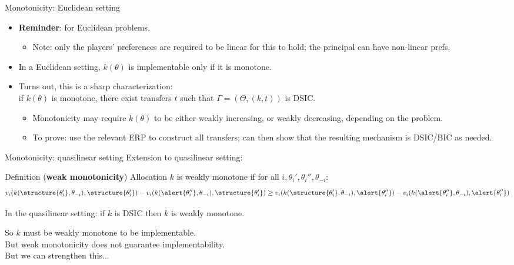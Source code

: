 \documentclass[english,10pt
,aspectratio=169
]{beamer}
\begin{document}
\begin{frame}{Monotonicity: Euclidean setting}
	\begin{itemize}
		\item \textbf{Reminder}:  for Euclidean problems.
		\begin{itemize}
			\item Note: only the players' preferences are required to be linear for this to hold; the principal can have non-linear prefs. 
		\end{itemize}
		\item In a \alert{Euclidean} setting, $k(\theta)$ is implementable only if it is monotone.
		\item Turns out, this is a sharp characterization: \\
		if $k(\theta)$ is monotone, there exist transfers $t$ such that $\Gamma = (\Theta, (k,t))$ is DSIC.
		\begin{itemize}
			\item Monotonicity may require $k(\theta)$ to be either weakly increasing, or weakly decreasing, depending on the problem.
			\item To prove: use the relevant ERP to construct all transfers; can then show that the resulting mechanism is DSIC/BIC as needed.
		\end{itemize}
	\end{itemize}
\end{frame}


\begin{frame}{Monotonicity: quasilinear setting}
	Extension to \alert{quasilinear} setting:
	\begin{exampleblock}{Definition (\textbf{weak monotonicity})}
		Allocation $k$ is \alert{weakly monotone} if for all $i,\theta_i',\theta_i'',\theta_{-i}$:
		\begin{equation*}
			v_{i}(k(\structure{\theta_{i}'}, \theta_{-i}), \structure{\theta_{i}'}) - 
			v_{i}(k(\alert{\theta_{i}''}, \theta_{-i}), \structure{\theta_{i}'}) 
			\geq 
			v_{i}(k(\structure{\theta_{i}'}, \theta_{-i}), \alert{\theta_{i}''}) - 
			v_{i}(k(\alert{\theta_{i}''}, \theta_{-i}), \alert{\theta_{i}''}) 
		\end{equation*}
	\end{exampleblock}
	\begin{theorem}
		In the quasilinear setting: if $k$ is DSIC then $k$ is weakly monotone.
	\end{theorem}
	So $k$ must be weakly monotone to be implementable.\\ 
	But weak monotonicity does not guarantee implementability. \\
	But we can strengthen this...
\end{frame}
\end{document}
